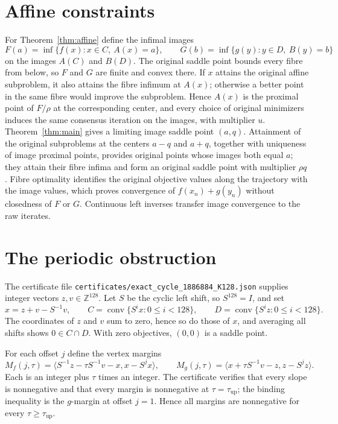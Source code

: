 \documentclass[11pt]{article}
\numberwithin{equation}{section}
\theoremstyle{definition}
\theoremstyle{remark}
\newcommand{\ip}[2]{\langle #1,#2\rangle}
\newcommand{\lean}[1]{{\urlstyle{tt}\nolinkurl{#1}}}
\newcommand{\conv}{\operatorname{conv}}
\newcommand{\tauup}{\tau_{\mathrm{up}}}
\begin{document}
\section{Affine constraints}\label{sec:affine}
For Theorem~\ref{thm:affine} define the infimal images
\[
F(a)=\inf\{f(x):x\in C,\ A(x)=a\},\qquad G(b)=\inf\{g(y):y\in D,\ B(y)=b\}
\]
on the images $A(C)$ and $B(D)$. The original saddle point bounds every fibre from below, so $F$ and $G$ are finite and convex there. If $x$ attains the original affine subproblem, it also attains the fibre infimum at $A(x)$; otherwise a better point in the same fibre would improve the subproblem. Hence $A(x)$ is the proximal point of $F/\rho$ at the corresponding center, and every choice of original minimizers induces the same consensus iteration on the images, with multiplier $u$. Theorem~\ref{thm:main} gives a limiting image saddle point $(a,q)$. Attainment of the original subproblems at the centers $a-q$ and $a+q$, together with uniqueness of image proximal points, provides original points whose images both equal $a$; they attain their fibre infima and form an original saddle point with multiplier $\rho q$. Fibre optimality identifies the original objective values along the trajectory with the image values, which proves convergence of $f(x_n)+g(y_n)$ without closedness of $F$ or $G$. Continuous left inverses transfer image convergence to the raw iterates.

\section{The periodic obstruction}\label{sec:cycle}
The certificate file \lean{certificates/exact_cycle_1886884_K128.json} supplies integer vectors $z,v\in\mathbb Z^{128}$. Let $S$ be the cyclic left shift, so $S^{128}=I$, and set
\[
x=z+v-S^{-1}v,\qquad C=\conv\{S^ix:0\le i<128\},\qquad D=\conv\{S^iz:0\le i<128\}.
\]
The coordinates of $z$ and $v$ sum to zero, hence so do those of $x$, and averaging all shifts shows $0\in C\cap D$. With zero objectives, $(0,0)$ is a saddle point.

For each offset $j$ define the vertex margins
\[
M_f(j,\tau)=\ip{S^{-1}z-\tau S^{-1}v-x}{x-S^jx},\qquad M_g(j,\tau)=\ip{x+\tau S^{-1}v-z}{z-S^jz}.
\]
Each is an integer plus $\tau$ times an integer. The certificate verifies that every slope is nonnegative and that every margin is nonnegative at $\tau=\tauup$; the binding inequality is the $g$-margin at offset $j=1$. Hence all margins are nonnegative for every $\tau\ge\tauup$.
\end{document}
